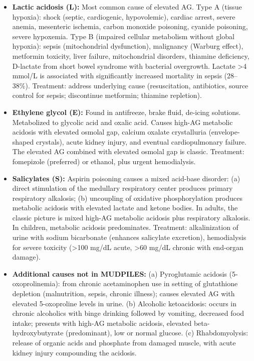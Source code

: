 \begin{itemize}
  \item \textbf{Lactic acidosis (L):} Most common cause of elevated AG. Type A (tissue hypoxia): shock (septic, cardiogenic, hypovolemic), cardiac arrest, severe anemia, mesenteric ischemia, carbon monoxide poisoning, cyanide poisoning, severe hypoxemia. Type B (impaired cellular metabolism without global hypoxia): sepsis (mitochondrial dysfunction), malignancy (Warburg effect), metformin toxicity, liver failure, mitochondrial disorders, thiamine deficiency, D-lactate from short bowel syndrome with bacterial overgrowth. Lactate >4 mmol/L is associated with significantly increased mortality in sepsis (28--38\%). Treatment: address underlying cause (resuscitation, antibiotics, source control for sepsis; discontinue metformin; thiamine repletion).
  \item \textbf{Ethylene glycol (E):} Found in antifreeze, brake fluid, de-icing solutions. Metabolized to glycolic acid and oxalic acid. Causes high-AG metabolic acidosis with elevated osmolal gap, calcium oxalate crystalluria (envelope-shaped crystals), acute kidney injury, and eventual cardiopulmonary failure. The elevated AG combined with elevated osmolal gap is classic. Treatment: fomepizole (preferred) or ethanol, plus urgent hemodialysis.
  \item \textbf{Salicylates (S):} Aspirin poisoning causes a mixed acid-base disorder: (a) direct stimulation of the medullary respiratory center produces primary respiratory alkalosis; (b) uncoupling of oxidative phosphorylation produces metabolic acidosis with elevated lactate and ketone bodies. In adults, the classic picture is mixed high-AG metabolic acidosis plus respiratory alkalosis. In children, metabolic acidosis predominates. Treatment: alkalinization of urine with sodium bicarbonate (enhances salicylate excretion), hemodialysis for severe toxicity (>100 mg/dL acute, >60 mg/dL chronic with end-organ damage).
  \item \textbf{Additional causes not in MUDPILES:} (a) Pyroglutamic acidosis (5-oxoprolinemia): from chronic acetaminophen use in setting of glutathione depletion (malnutrition, sepsis, chronic illness); causes elevated AG with elevated 5-oxoproline levels in urine. (b) Alcoholic ketoacidosis: occurs in chronic alcoholics with binge drinking followed by vomiting, decreased food intake; presents with high-AG metabolic acidosis, elevated beta-hydroxybutyrate (predominant), low or normal glucose. (c) Rhabdomyolysis: release of organic acids and phosphate from damaged muscle, with acute kidney injury compounding the acidosis.

\end{itemize}
